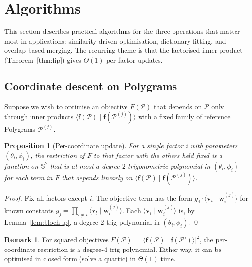 \documentclass[11pt,letterpaper]{article}
\newtheorem{proposition}[theorem]{Proposition}
\theoremstyle{definition}
\newtheorem{remark}[theorem]{Remark}
\newcommand{\Sphere}{\mathbb{S}}
\newcommand{\Polygram}{\mathcal{P}}
\newcommand{\inner}[2]{\langle #1 \mid #2 \rangle}
\newcommand{\abs}[1]{\lvert #1 \rvert}
\begin{document}
\section{Algorithms}
\label{sec:algorithms}

This section describes practical algorithms for the three operations that
matter most in applications: similarity-driven optimisation, dictionary
fitting, and overlap-based merging. The recurring theme is that the
factorised inner product (Theorem~\ref{thm:fip}) gives $\Theta(1)$ per-factor
updates.

\subsection{Coordinate descent on Polygrams}

Suppose we wish to optimise an objective $F(\Polygram)$ that depends on
$\Polygram$ only through inner products
$\inner{\bm{f}(\Polygram)}{\bm{f}(\Polygram^{(j)})}$ with a fixed family of
reference Polygrams $\Polygram^{(j)}$.

\begin{proposition}[Per-coordinate update]
\label{prop:coord-descent}
For a single factor $i$ with parameters $(\theta_{i}, \phi_{i})$, the
restriction of $F$ to that factor with the others held fixed is a function on
$\Sphere^{2}$ that is at most a degree-$2$ trigonometric polynomial in
$(\theta_{i}, \phi_{i})$ for each term in $F$ that depends linearly on
$\inner{\bm{f}(\Polygram)}{\bm{f}(\Polygram^{(j)})}$.
\end{proposition}

\begin{proof}
Fix all factors except $i$. The objective term has the form
$g_{j} \cdot \inner{\bm{v}_{i}}{\bm{w}^{(j)}_{i}}$ for known constants
$g_{j} = \prod_{l \neq i} \inner{\bm{v}_{l}}{\bm{w}^{(j)}_{l}}$. Each
$\inner{\bm{v}_{i}}{\bm{w}^{(j)}_{i}}$ is, by Lemma~\ref{lem:bloch-ip},
a degree-$2$ trig polynomial in $(\theta_{i}, \phi_{i})$. \qed
\end{proof}

\begin{remark}
For squared objectives $F(\Polygram) = \abs{\inner{\bm{f}(\Polygram)}{
\bm{f}(\Polygram')}}^{2}$, the per-coordinate restriction is a degree-$4$ trig
polynomial. Either way, it can be optimised in closed form (solve a quartic)
in $\Theta(1)$ time.
\end{remark}
\end{document}
